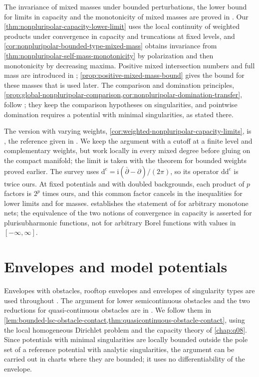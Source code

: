 The invariance of mixed masses under bounded perturbations, the lower bound for limits in capacity and the monotonicity of mixed masses are proved in \cite[Proposition 2.1, Theorem 2.3 and Theorem 2.4]{DDNL18mono}. Our \cref{thm:nonpluripolar-capacity-lower-limit} uses the local continuity of weighted products under convergence in capacity and truncations at fixed levels, and \cref{cor:nonpluripolar-bounded-type-mixed-mass} obtains invariance from \cref{thm:nonpluripolar-self-mass-monotonicity} by polarization and then monotonicity by decreasing maxima. Positive mixed intersection numbers and full mass are introduced in \cite[Definition 1.17, Proposition 1.20 and Definition 1.21]{BEGZ10}; \cref{prop:positive-mixed-mass-bound} gives the bound for these masses that is used later. The comparison and domination principles, \cref{prop:global-nonpluripolar-comparison,cor:nonpluripolar-domination-transfer}, follow \cite[Corollaries 4.1--4.2]{WN19}; they keep the comparison hypotheses on singularities, and pointwise domination requires a potential with minimal singularities, as stated there.

The version with varying weights, \cref{cor:weighted-nonpluripolar-capacity-limits}, is \cite[Theorem 2.6 and its proof]{DDNLsurv}, the reference given in \cite[Theorem~2.4.2]{XiaSampleBook}. We keep the argument with a cutoff at a finite level and complementary weights, but work locally in every mixed degree before gluing on the compact manifold; the limit is taken with the theorem for bounded weights proved earlier. The survey uses $\mathrm d^{\mathrm c}=\mathrm i(\bar\partial-\partial)/(2\pi)$, so its operator $\mathrm d\mathrm d^{\mathrm c}$ is twice ours. At fixed potentials and with doubled backgrounds, each product of $p$ factors is $2^p$ times ours, and this common factor cancels in the inequalities for lower limits and for masses.  establishes the statement of \cite[Proposition~2.3.1]{XiaSampleBook} for arbitrary monotone nets; the equivalence of the two notions of convergence in capacity is asserted for plurisubharmonic functions, not for arbitrary Borel functions with values in $[-\infty,\infty]$.

\section{Envelopes and model potentials}\label{sec:history-envelopes}
Envelopes with obstacles, rooftop envelopes and envelopes of singularity types are used throughout \cite{XiaSampleBook}. The argument for lower semicontinuous obstacles and the two reductions for quasi-continuous obstacles are in \cite[Lemma~2.4.3 and Theorem~2.4.4]{XiaSampleBook}. We follow them in \cref{lem:bounded-lsc-obstacle-contact,thm:quasicontinuous-obstacle-contact}, using the local homogeneous Dirichlet problem and the capacity theory of \cref{chap:q08}. Since potentials with minimal singularities are locally bounded outside the pole set of a reference potential with analytic singularities, the argument can be carried out in charts where they are bounded; it uses no differentiability of the envelope.

